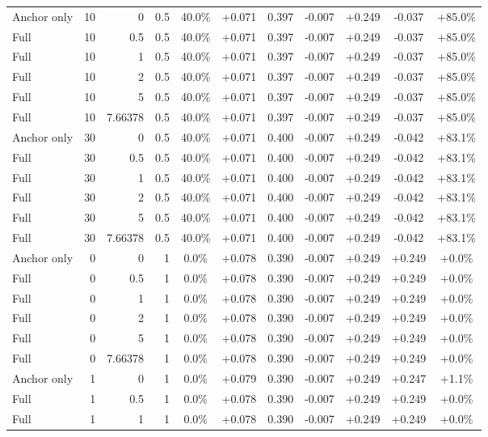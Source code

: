 \begin{table}[htbp]
\begin{tabular}{lrrrccccccc}
Anchor only & 10 & 0 & 0.5 & 40.0\% & +0.071 & 0.397 & -0.007 & +0.249 & -0.037 & +85.0\% \\
Full & 10 & 0.5 & 0.5 & 40.0\% & +0.071 & 0.397 & -0.007 & +0.249 & -0.037 & +85.0\% \\
Full & 10 & 1 & 0.5 & 40.0\% & +0.071 & 0.397 & -0.007 & +0.249 & -0.037 & +85.0\% \\
Full & 10 & 2 & 0.5 & 40.0\% & +0.071 & 0.397 & -0.007 & +0.249 & -0.037 & +85.0\% \\
Full & 10 & 5 & 0.5 & 40.0\% & +0.071 & 0.397 & -0.007 & +0.249 & -0.037 & +85.0\% \\
Full & 10 & 7.66378 & 0.5 & 40.0\% & +0.071 & 0.397 & -0.007 & +0.249 & -0.037 & +85.0\% \\
Anchor only & 30 & 0 & 0.5 & 40.0\% & +0.071 & 0.400 & -0.007 & +0.249 & -0.042 & +83.1\% \\
Full & 30 & 0.5 & 0.5 & 40.0\% & +0.071 & 0.400 & -0.007 & +0.249 & -0.042 & +83.1\% \\
Full & 30 & 1 & 0.5 & 40.0\% & +0.071 & 0.400 & -0.007 & +0.249 & -0.042 & +83.1\% \\
Full & 30 & 2 & 0.5 & 40.0\% & +0.071 & 0.400 & -0.007 & +0.249 & -0.042 & +83.1\% \\
Full & 30 & 5 & 0.5 & 40.0\% & +0.071 & 0.400 & -0.007 & +0.249 & -0.042 & +83.1\% \\
Full & 30 & 7.66378 & 0.5 & 40.0\% & +0.071 & 0.400 & -0.007 & +0.249 & -0.042 & +83.1\% \\
Anchor only & 0 & 0 & 1 & 0.0\% & +0.078 & 0.390 & -0.007 & +0.249 & +0.249 & +0.0\% \\
Full & 0 & 0.5 & 1 & 0.0\% & +0.078 & 0.390 & -0.007 & +0.249 & +0.249 & +0.0\% \\
Full & 0 & 1 & 1 & 0.0\% & +0.078 & 0.390 & -0.007 & +0.249 & +0.249 & +0.0\% \\
Full & 0 & 2 & 1 & 0.0\% & +0.078 & 0.390 & -0.007 & +0.249 & +0.249 & +0.0\% \\
Full & 0 & 5 & 1 & 0.0\% & +0.078 & 0.390 & -0.007 & +0.249 & +0.249 & +0.0\% \\
Full & 0 & 7.66378 & 1 & 0.0\% & +0.078 & 0.390 & -0.007 & +0.249 & +0.249 & +0.0\% \\
Anchor only & 1 & 0 & 1 & 0.0\% & +0.079 & 0.390 & -0.007 & +0.249 & +0.247 & +1.1\% \\
Full & 1 & 0.5 & 1 & 0.0\% & +0.078 & 0.390 & -0.007 & +0.249 & +0.249 & +0.0\% \\
Full & 1 & 1 & 1 & 0.0\% & +0.078 & 0.390 & -0.007 & +0.249 & +0.249 & +0.0\% \\

\end{tabular}
\end{table}
